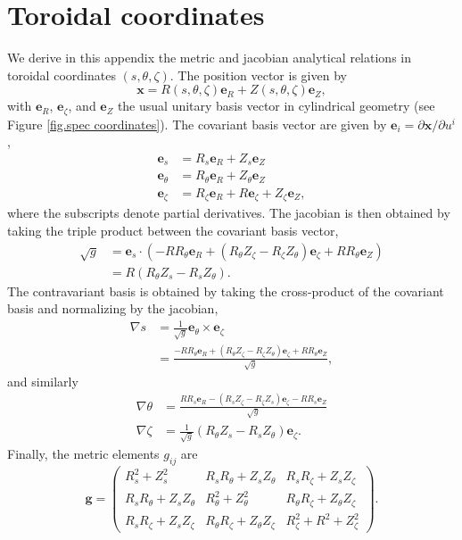 \chapter{Toroidal coordinates} \label{app. toroidal coordinates}
We derive in this appendix the metric and jacobian analytical relations in toroidal coordinates $(s,\theta,\zeta)$. The position vector is given by
\begin{equation}
	\mathbf{x}=R(s,\theta,\zeta)\mathbf{e}_R+Z(s,\theta,\zeta)\mathbf{e}_Z,
\end{equation}
with $\mathbf{e}_R$, $\mathbf{e}_\zeta$, and $\mathbf{e}_Z$ the usual unitary basis vector in cylindrical geometry (see Figure \ref{fig.spec coordinates}). The covariant basis vector are given by $\mathbf{e}_i=\partial\mathbf{x}/\partial u^i$, 
\begin{align}
	\mathbf{e}_s &= R_s\mathbf{e}_R+Z_s\mathbf{e}_Z\\
	\mathbf{e}_\theta &= R_\theta\mathbf{e}_R+Z_\theta\mathbf{e}_Z\\
	\mathbf{e}_\zeta &= R_\zeta\mathbf{e}_R+R\mathbf{e}_\zeta +Z_\zeta\mathbf{e}_Z,
\end{align}
where the subscripts denote partial derivatives. The jacobian is then obtained by taking the triple product between the covariant basis vector, 
\begin{align}
	\sqrt{g}&=\mathbf{e}_s\cdot (-RR_\theta\mathbf{e}_R + (R_\theta Z_\zeta-R_\zeta Z_\theta)\mathbf{e}_\zeta + RR_\theta\mathbf{e}_Z)\\
	&= R(R_\theta Z_s - R_s Z_\theta).
\end{align}
The contravariant basis is obtained by taking the cross-product of the covariant basis and normalizing by the jacobian,
\begin{align}
	\nabla s &= \frac{1}{\sqrt{g}} \mathbf{e}_\theta\times\mathbf{e}_\zeta \\
	&= \frac{-RR_\theta\mathbf{e}_R + (R_\theta Z_\zeta-R_\zeta Z_\theta)\mathbf{e}_\zeta + RR_\theta\mathbf{e}_Z}{\sqrt{g}},
\end{align}
and similarly
\begin{align}
	\nabla\theta &= \frac{RR_s\mathbf{e}_R - (R_s Z_\zeta-R_\zeta Z_s)\mathbf{e}_\zeta - RR_s\mathbf{e}_Z}{\sqrt{g}}\\
	\nabla\zeta &= \frac{1}{\sqrt{g}}(R_\theta Z_s-R_s Z_\theta)\mathbf{e}_\zeta.
\end{align}
Finally, the metric elements $g_{ij}$ are
\begin{equation}
	\mathbf{g}=\begin{pmatrix}
		R_s^2 + Z_s^2 & R_s R_\theta + Z_s Z_\theta &  R_s R_\zeta + Z_s Z_\zeta\\
		R_s R_\theta + Z_s Z_\theta & R_\theta^2 + Z_\theta^2 &  R_\theta R_\zeta + Z_\theta Z_\zeta\\
		R_s R_\zeta + Z_s Z_\zeta & R_\theta R_\zeta + Z_\theta Z_\zeta & R_\zeta^2 + R^2 + Z_\zeta^2
	\end{pmatrix}.
\end{equation}



